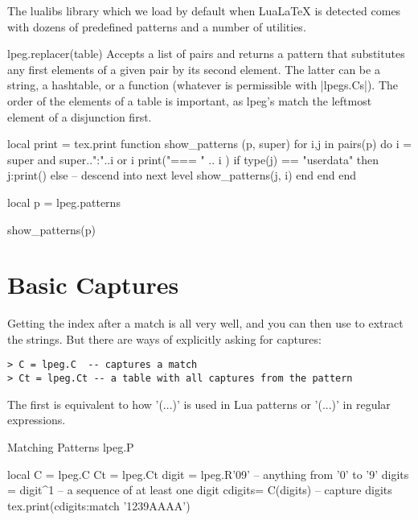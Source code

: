 The lualibs library which we load by default when LuaLaTeX is detected comes with dozens of predefined patterns and a number of utilities.


lpeg.replacer(table) Accepts a list of pairs and returns a pattern that substitutes any first elements of a given pair by its second element. The latter can be a string, a hashtable, or a function (whatever is permissible with |lpegs.Cs|).
The order of the elements of a table is important, as lpeg's match the leftmost element of a disjunction first.

\begin{luacode}
local print = tex.print
function show_patterns (p, super)
    for i,j in pairs(p) do
        i = super and super..":"..i or i
        print("=== " .. i )
        if type(j) == "userdata" then
            j:print()
        else -- descend into next level
            show_patterns(j, i)
        end 
    end 
end

local p = lpeg.patterns

show_patterns(p)

\end{luacode}

\section{Basic Captures}

Getting the index after a match is all very well, and you can then use  to extract the strings. But there are ways of explicitly asking for captures:

\begin{verbatim}
> C = lpeg.C  -- captures a match
> Ct = lpeg.Ct -- a table with all captures from the pattern
\end{verbatim}

The first is equivalent to how '(...)' is used in Lua patterns or '(...)' in regular expressions.

\begin{texexample}{Matching Patterns lpeg.P}{}
\begin{luacode}
 local C = lpeg.C
 Ct = lpeg.Ct
 digit = lpeg.R'09'  --  anything from '0' to '9'
 digits = digit^1    --  a sequence of at least one digit
 cdigits= C(digits)  --  capture digits
 tex.print(cdigits:match '1239AAAA')
\end{luacode}
\end{texexample}


